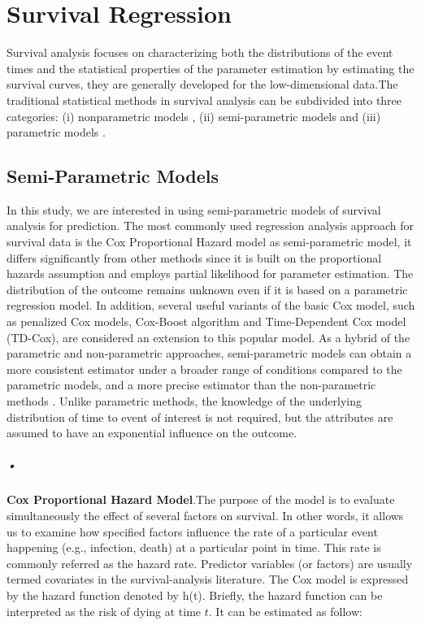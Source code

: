 \documentclass[10pt,twocolumn]{article}
\begin{document}
\section{Survival Regression}
Survival analysis focuses on characterizing both the distributions of the event times and the statistical properties of the parameter estimation by estimating the survival curves, they are generally developed for the low-dimensional data.The traditional statistical methods in survival analysis can be subdivided into three categories: (i) nonparametric models \cite{kaplan1958nonparametric}, (ii) semi-parametric models  and (iii) parametric models \cite{cutler1958maximum}. 
\subsection{Semi-Parametric Models}
In this study, we are interested in using semi-parametric models of survival analysis for prediction. The most commonly used regression analysis approach for survival data is the Cox Proportional Hazard model as semi-parametric model, it differs significantly from other methods since it is built on the proportional hazards assumption and employs partial likelihood for parameter estimation. The distribution of the outcome remains unknown even if it is based on a parametric regression model. In addition, several useful variants of the basic Cox model, such as penalized Cox models, Cox-Boost algorithm and Time-Dependent Cox model (TD-Cox), are considered an extension to this popular model.  As a hybrid of the parametric and non-parametric approaches, semi-parametric models can obtain a more consistent estimator under a broader range of conditions compared to the parametric models, and a more precise estimator than the non-parametric methods \cite{powell1994estimation}. Unlike parametric methods, the knowledge of the underlying distribution of time to event of interest is not required, but the attributes are assumed to have an exponential influence on the outcome. 
\subparagraph{•}
\textbf{Cox Proportional Hazard Model}.The purpose of the model is to evaluate simultaneously the effect of several factors on survival. In other words, it allows us to examine how specified factors influence the rate of a particular event happening (e.g., infection, death) at a particular point in time. This rate is commonly referred as the hazard rate. Predictor variables (or factors) are usually termed covariates in the survival-analysis literature.
The Cox model is expressed by the hazard function denoted by h(t). Briefly, the hazard function can be interpreted as the risk of dying at time $t$. It can be estimated as follow:
\end{document}

